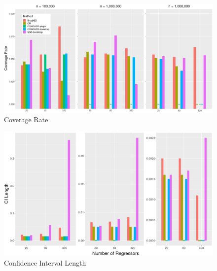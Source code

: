 \documentclass[beamer, t]{beamer}
\begin{document}
\begin{frame}
	
	\begin{figure}[!htbp]
		\caption{Coverage Rate} \label{fig:ci}
		\centering
		\vskip10pt
		\includegraphics[width=\textwidth]{figures/fig_coverage.png}
	\end{figure}
	
\end{frame}


\begin{frame}
	
	\begin{figure}[!htbp]
		\caption{Confidence Interval Length} \label{fig:ci}
		\centering
		\vskip10pt
			\includegraphics[width=\textwidth]{figures/fig_ci_length.png}
	\end{figure}
	
\end{frame}
\end{document}
